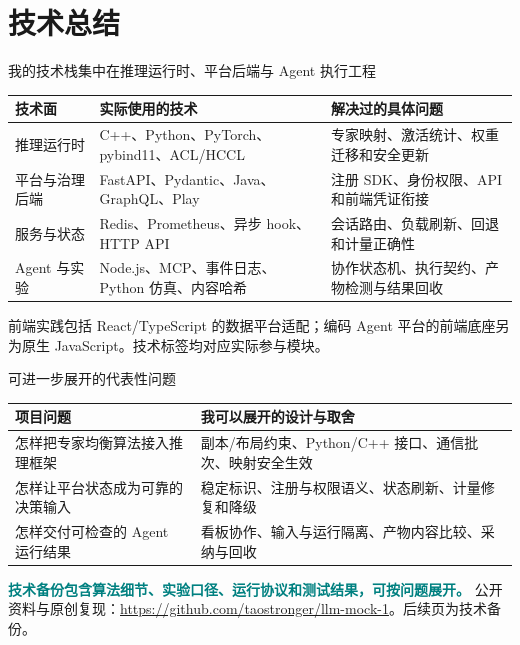 \documentclass[aspectratio=169,10pt]{beamer}
\newcommand{\src}[1]{\vfill{\fontsize{6.7}{8}\selectfont\color{Muted}#1}\par}
\newcommand{\term}[1]{\textcolor{Teal}{\textbf{#1}}}
\begin{document}
\section{技术总结}
\begin{frame}{我的技术栈集中在推理运行时、平台后端与 Agent 执行工程}
\renewcommand{\arraystretch}{1.55}
\begin{tabularx}{\textwidth}{@{}p{2.6cm}YY@{}}
\toprule 技术面 & 实际使用的技术 & 解决过的具体问题 \\
\midrule
推理运行时 & C++、Python、PyTorch、pybind11、ACL/HCCL & 专家映射、激活统计、权重迁移和安全更新 \\
平台与治理后端 & FastAPI、Pydantic、Java、GraphQL、Play & 注册 SDK、身份权限、API 和前端凭证衔接 \\
服务与状态 & Redis、Prometheus、异步 hook、HTTP API & 会话路由、负载刷新、回退和计量正确性 \\
Agent 与实验 & Node.js、MCP、事件日志、Python 仿真、内容哈希 & 协作状态机、执行契约、产物检测与结果回收 \\
\bottomrule
\end{tabularx}
\src{前端实践包括 React/TypeScript 的数据平台适配；编码 Agent 平台的前端底座另为原生 JavaScript。技术标签均对应实际参与模块。}
\end{frame}

\begin{frame}{可进一步展开的代表性问题}
\renewcommand{\arraystretch}{1.8}
\begin{tabularx}{\textwidth}{@{}p{4.7cm}Y@{}}
\toprule 项目问题 & 我可以展开的设计与取舍 \\
\midrule
怎样把专家均衡算法接入推理框架 & 副本/布局约束、Python/C++ 接口、通信批次、映射安全生效 \\
怎样让平台状态成为可靠的决策输入 & 稳定标识、注册与权限语义、状态刷新、计量修复和降级 \\
怎样交付可检查的 Agent 运行结果 & 看板协作、输入与运行隔离、产物内容比较、采纳与回收 \\
\bottomrule
\end{tabularx}
\medskip
\term{技术备份包含算法细节、实验口径、运行协议和测试结果，可按问题展开。}
\src{公开资料与原创复现：\url{https://github.com/taostronger/llm-mock-1}。后续页为技术备份。}
\end{frame}

\appendix
\end{document}
